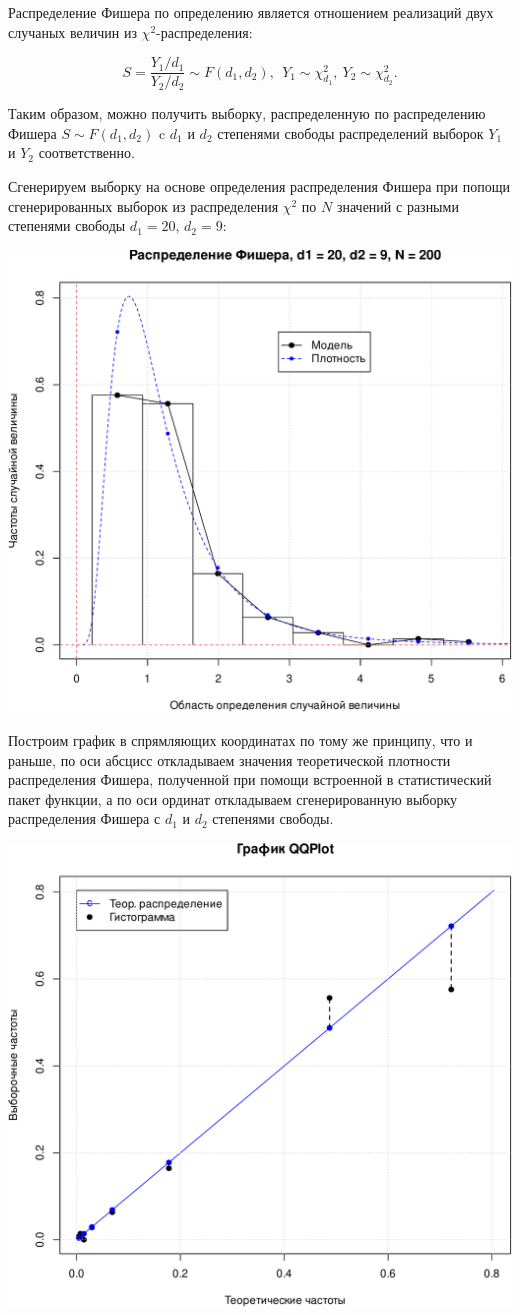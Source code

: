 \documentclass[
]{article}
\begin{document}
Распределение Фишера по определению является отношением реализаций двух
случаных величин из \(\chi^2\)-распределения:

\[
S = \frac{Y_1/d_1}{Y_2/d_2} \sim F(d_1, d_2),\ \ Y_1 \sim \chi_{d_1}^2, \ Y_2 \sim \chi_{d_2}^2.
\]

Таким образом, можно получить выборку, распределенную по распределению
Фишера \(S \sim F(d_1, d_2)\) c \(d_1\) и \(d_2\) степенями свободы
распределений выборок \(Y_1\) и \(Y_2\) соответственно.

Сгенерируем выборку на основе определения распределения Фишера при
попощи сгенерированных выборок из распределения \(\chi^2\) по \(N\)
значений с разными степенями свободы \(d_1 = 20\), \(d_2 = 9\):

\begin{center}\includegraphics[width=0.6\linewidth]{Prac4_files/figure-latex/unnamed-chunk-7-1} \end{center}

Построим график в спрямляющих координатах по тому же принципу, что и
раньше, по оси абсцисс откладываем значения теоретической плотности
распределения Фишера, полученной при помощи встроенной в статистический
пакет функции, а по оси ординат откладываем сгенерированную выборку
распределения Фишера с \(d_1\) и \(d_2\) степенями свободы.

\begin{center}\includegraphics[width=0.6\linewidth]{Prac4_files/figure-latex/unnamed-chunk-8-1} \end{center}
\end{document}

